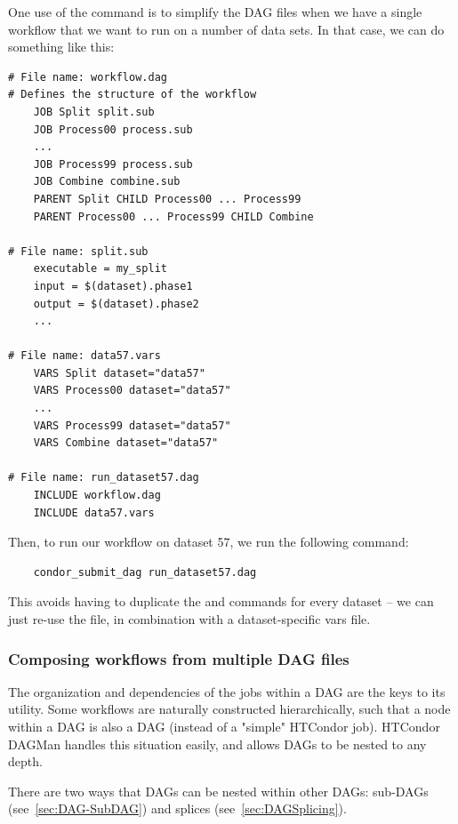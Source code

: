 One use of the  command is to simplify the DAG files when we
have a single workflow that we want to run on a number of data sets.
In that case, we can do something like this:

\begin{verbatim}
# File name: workflow.dag
# Defines the structure of the workflow
    JOB Split split.sub
    JOB Process00 process.sub
    ...
    JOB Process99 process.sub
    JOB Combine combine.sub
    PARENT Split CHILD Process00 ... Process99
    PARENT Process00 ... Process99 CHILD Combine

# File name: split.sub
    executable = my_split
    input = $(dataset).phase1
    output = $(dataset).phase2
    ...

# File name: data57.vars
    VARS Split dataset="data57"
    VARS Process00 dataset="data57"
    ...
    VARS Process99 dataset="data57"
    VARS Combine dataset="data57"

# File name: run_dataset57.dag
    INCLUDE workflow.dag
    INCLUDE data57.vars
\end{verbatim}

Then, to run our workflow on dataset 57, we run the following
command:

\begin{verbatim}
    condor_submit_dag run_dataset57.dag
\end{verbatim}

This avoids having to duplicate the  and 
commands for every dataset -- we can just re-use the  file,
in combination with a dataset-specific vars file.

\subsubsection{\label{sec:ComposingDAGs}Composing workflows from multiple
DAG files}

The organization and dependencies of the jobs within a DAG
are the keys to its utility.
Some workflows are naturally constructed hierarchically,
such that a node within a DAG is also a DAG (instead of a
"simple" HTCondor job).
HTCondor DAGMan handles this situation easily, and allows
DAGs to be nested to any depth.

There are two ways that DAGs can be nested within other DAGs:
sub-DAGs (see~\ref{sec:DAG-SubDAG}) and splices (see~\ref{sec:DAGSplicing}).

